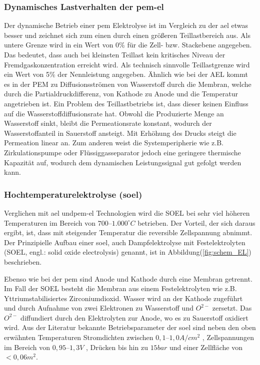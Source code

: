 \documentclass[onecolumn,10pt,titlepage]{article}
\begin{document}
			\subsubsection*{Dynamisches Lastverhalten der \gls{pem}-\gls{el}}	
			Der dynamische Betrieb einer \gls{pem} Elektrolyse ist im Vergleich zu der \gls{ael} etwas besser und zeichnet sich zum einen durch einen größeren Teillastbereich aus. Als untere Grenze wird in \cite{Smolinka.05.07.2011} ein Wert von 0\% für die Zell- bzw. Stackebene angegeben. Das bedeutet, dass auch bei kleinsten Teillast kein kritisches Niveau der Fremdgaskonzentration erreicht wird. Als technisch sinnvolle Teillastgrenze wird ein Wert von 5\% der Nennleistung angegeben. Ähnlich wie bei der AEL kommt es in der PEM zu Diffusionsströmen von Wasserstoff durch die Membran, welche durch die Partialdruckdifferenz, von Kathode zu Anode und die Temperatur angetrieben ist. Ein Problem des Teillastbetriebs ist, dass dieser keinen Einfluss auf die Wasserstoffdiffusionsrate hat. Obwohl die Produzierte Menge an Wasserstoff sinkt, bleibt die Permeationsrate konstant, wodurch der Wasserstoffanteil in Sauerstoff ansteigt. Mit Erhöhung des Drucks steigt die Permeation linear an. 
			Zum anderen weist die Systemperipherie wie z.B. Zirkulationspumpe oder Flüssiggasseparator jedoch eine geringere thermische Kapazität auf, wodurch dem dynamischen Leistungssignal gut gefolgt werden kann. 
			
			\subsubsection*{Hochtemperaturelektrolyse (\gls{soel})}	
			Verglichen mit \gls{ael} und\gls{pem}-\gls{el} Technologien wird die SOEL bei sehr viel höheren Temperaturen im Bereich von $700–1.000 ^\circ C$ \cite{Zhang.2010} betrieben. Der Vorteil, der sich daraus ergibt, ist, dass mit steigender Temperatur die reversible Zellspannung abnimmt. Der Prinzipielle Aufbau einer \gls{soel}, auch Dampfelektrolyse mit Festelektrolyten (SOEL, engl.: solid oxide electrolysis) genannt, ist in Abbildung(\ref{fig:schem_EL}) beschrieben.
			
			Ebenso wie bei der \gls{pem} sind Anode und Kathode durch eine Membran getrennt. Im Fall der SOEL besteht die Membran aus einem Festelektrolyten wie z.B. Yttriumstabilisiertes Zirconiumdioxid.\cite{Ghaib.2017} Wasser wird an der Kathode zugeführt und durch Aufnahme von zwei Elektronen zu Wasserstoff und $O^{2-}$ zersetzt. Das $O^{2-}$ diffundiert durch den Elektrolyten zur Anode, wo es zu Sauerstoff oxidiert wird.
			Aus der Literatur bekannte Betriebsparameter der \gls{soel} sind neben den oben erwähnten Temperaturen Stromdichten zwischen $0,1–1,0 A/cm^2$ \cite{Buttler.2018}, Zellspannungen im Bereich von $0,95–1,3 V$ \cite{Ghaib.2017} , Drücken bis hin zu $15 bar$ \cite{Buttler.2018} und einer Zellfläche von $<0,06 m^2$.
			
\end{document}
